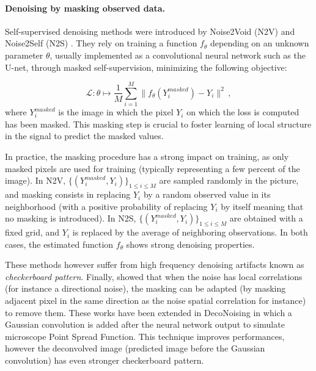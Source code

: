 \documentclass{article}
\begin{document}
\paragraph{Denoising by masking observed data.}
Self-supervised denoising methods were introduced by Noise2Void (N2V) \cite{krull2018noise2void} and Noise2Self (N2S) \cite{batson2019noise2self}. They rely on training a function $f_\theta$ depending on an unknown parameter $\theta$, usually  implemented as a convolutional neural network such as the U-net, through masked self-supervision, minimizing the following objective:

$$\mathcal{L}: \theta\mapsto \frac{1}{M}\sum_{i=1}^M \|f_\theta(Y^{masked}_i) - Y_i\|^2\,, $$
where $Y^{masked}_i$ is the image in which the pixel $Y_i$  on which the loss is computed  has been masked. This masking step is crucial to foster learning of  local structure in the signal to predict the masked values.

In practice, the masking procedure has a strong impact on training, as only masked pixels are used for training (typically representing a few percent of the image). In N2V, $\{(Y^{masked}_i,Y_i)\}_{1\leqslant i\leqslant M}$ are sampled  randomly in the picture, and masking consists in replacing $Y_i$ by a random observed value in its neighborhood (with a positive probability of replacing $Y_i$ by itself meaning that no masking is introduced). In N2S,  $\{(Y^{masked}_i,Y_i)\}_{1\leqslant i\leqslant M}$ are obtained with  a fixed grid, and $Y_i$ is replaced by the average of neighboring observations.
In both cases, the estimated function $f_{\theta}$ shows strong denoising properties.

These methods however suffer from high frequency denoising artifacts known as \textit{checkerboard pattern}. Finally, \cite{broaddus2020removing} showed that when the noise has  local correlations (for instance a  directional noise), the masking can be adapted (by masking adjacent pixel in the same direction as the noise spatial correlation for instance) to remove them. These works have been extended in DecoNoising \cite{goncharova2020} in which a Gaussian convolution is added after the neural network output to simulate microscope Point Spread Function. This technique improves performances, however the deconvolved image (predicted image before the Gaussian convolution) has even stronger checkerboard pattern.
\end{document}
